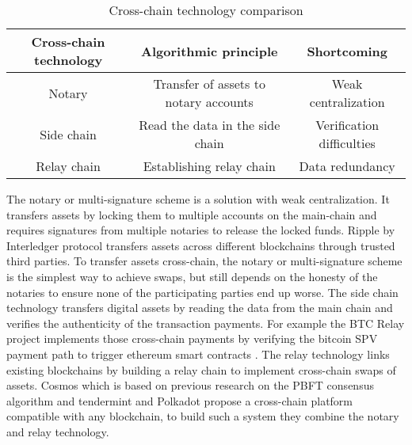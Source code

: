 \begin{table}[h!]
	\centering
	\begin{tabular}{|c | c | c |} 
		\hline 
		Cross-chain technology & Algorithmic principle & Shortcoming \\ [0.5ex] 
		\hline \hline
		Notary & Transfer of assets to notary accounts & Weak centralization  \\ 
		\hline
		Side chain & Read the data in the side chain & Verification difficulties  \\
		\hline
		Relay chain & Establishing relay chain & Data redundancy  \\ [1ex] 
		\hline
	\end{tabular}
	\caption{Cross-chain technology comparison}
	\label{table:1}
\end{table}

The notary or multi-signature scheme is a solution with weak centralization. It transfers assets by locking them to multiple accounts on the main-chain and requires signatures from multiple notaries to release the locked funds. Ripple by Interledger protocol \cite{hope2016interledger} transfers assets across different blockchains through trusted third parties. To transfer assets cross-chain, the notary or multi-signature scheme is the simplest way to achieve swaps, but still depends on the honesty of the notaries to ensure none of the participating parties end up worse. The side chain technology transfers digital assets by reading the data from the main chain and verifies the authenticity of the transaction payments. For example the BTC Relay \cite{btcrelay} project implements those cross-chain payments by verifying the bitcoin \ac{SPV} payment path to trigger ethereum smart contracts \cite{buterin2014ethereum}. The relay technology links existing blockchains by building a relay chain to implement cross-chain swaps of assets. Cosmos \cite{kwon2018network} which is based on previous research on the \ac{PBFT} consensus algorithm \cite{castro1999practical} and tendermint \cite{kwon2014tendermint} \cite{buchman2016tendermint} and Polkadot \cite{wood2016polkadot} propose a cross-chain platform compatible with any blockchain, to build such a system they combine the notary and relay technology.











